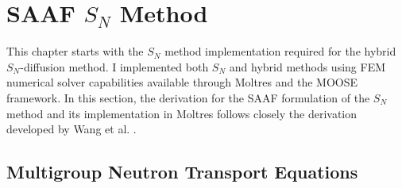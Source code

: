 
\section{\Gls{SAAF} $S_N$ Method} \label{sec:saaf}

This chapter starts with the $S_N$ method implementation required for the hybrid $S_N$-diffusion
method. I implemented both $S_N$ and hybrid methods using \gls{FEM} numerical solver capabilities
available through Moltres \cite{lindsay_moltres_2017} and the \gls{MOOSE} framework. In this
section, the derivation for the \gls{SAAF} formulation of the $S_N$ method and its
implementation in Moltres follows closely the derivation developed by Wang et al.
\cite{wang_diffusion_2014, wang_rattlesnake_2018}.

\subsection{Multigroup Neutron Transport Equations}

